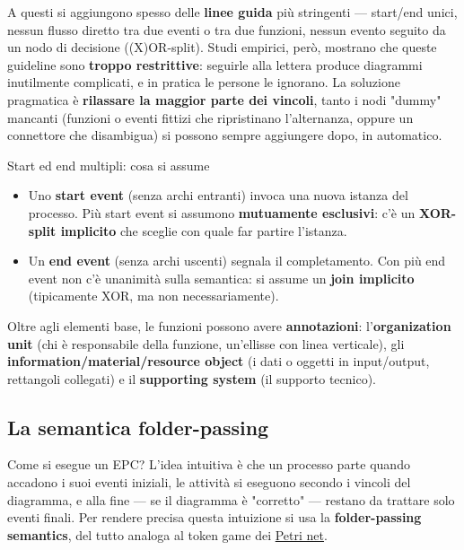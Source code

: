 A questi si aggiungono spesso delle \textbf{linee guida} più stringenti — start/end unici, nessun flusso diretto tra due eventi o tra due funzioni, nessun evento seguito da un nodo di decisione ((X)OR-split). Studi empirici, però, mostrano che queste guideline sono \textbf{troppo restrittive}: seguirle alla lettera produce diagrammi inutilmente complicati, e in pratica le persone le ignorano. La soluzione pragmatica è \textbf{rilassare la maggior parte dei vincoli}, tanto i nodi "dummy" mancanti (funzioni o eventi fittizi che ripristinano l'alternanza, oppure un connettore che disambigua) si possono sempre aggiungere dopo, in automatico.

\begin{boxnote}{Start ed end multipli: cosa si assume}
\begin{itemize}
\item Uno \textbf{start event} (senza archi entranti) invoca una nuova istanza del processo. Più start event si assumono \textbf{mutuamente esclusivi}: c'è un \textbf{XOR-split implicito} che sceglie con quale far partire l'istanza.
\item Un \textbf{end event} (senza archi uscenti) segnala il completamento. Con più end event non c'è unanimità sulla semantica: si assume un \textbf{join implicito} (tipicamente XOR, ma non necessariamente).
\end{itemize}
\end{boxnote}

Oltre agli elementi base, le funzioni possono avere \textbf{annotazioni}: l'\textbf{organization unit} (chi è responsabile della funzione, un'ellisse con linea verticale), gli \textbf{information/material/resource object} (i dati o oggetti in input/output, rettangoli collegati) e il \textbf{supporting system} (il supporto tecnico).

\subsection{\texorpdfstring{La semantica folder-passing}{La semantica folder-passing}}

Come si esegue un EPC? L'idea intuitiva è che un processo parte quando accadono i suoi eventi iniziali, le attività si eseguono secondo i vincoli del diagramma, e alla fine — se il diagramma è "corretto" — restano da trattare solo eventi finali. Per rendere precisa questa intuizione si usa la \textbf{folder-passing semantics}, del tutto analoga al token game dei \hyperref[ch:04]{Petri net}.

